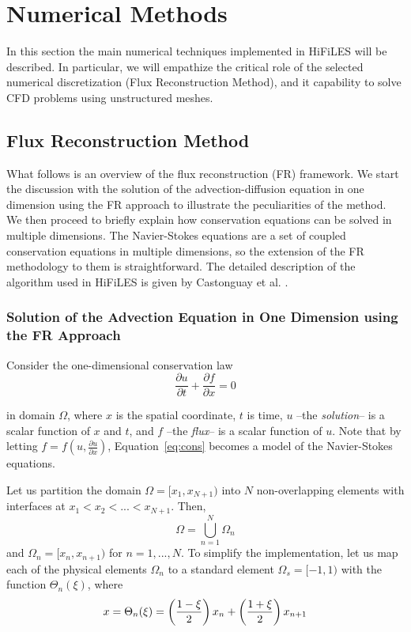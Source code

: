 
\section{Numerical Methods}
\label{sec:numerics}

In this section the main numerical techniques implemented in HiFiLES will be described. In particular, we will empathize the critical role of the selected numerical discretization (Flux Reconstruction Method), and it capability to solve CFD problems using unstructured meshes. 

\subsection{Flux Reconstruction Method}

What follows is an overview of the flux reconstruction (FR) framework. We start the discussion with the solution of the advection-diffusion equation in one dimension using the FR approach to illustrate the peculiarities of the method. We then proceed to briefly explain how conservation equations can be solved in multiple dimensions. The Navier-Stokes equations are a set of coupled conservation equations in multiple dimensions, so the extension of the FR methodology to them is straightforward. The detailed description of the algorithm used in HiFiLES is given by Castonguay et al. \cite{castonguay2011}.

\subsubsection{Solution of the Advection Equation in One Dimension using the FR Approach}

Consider the one-dimensional conservation law
\begin{equation}
\label{eq:cons}
\frac{\partial u}{\partial t} + \frac{\partial f}{\partial x} = 0
\end{equation}

in domain $\Omega$, where $x$ is the spatial coordinate, $t$ is time, $u$ --the \emph{solution}-- is a scalar function of $x$ and $t$, and $f$ --the \emph{flux}-- is a scalar function of $u$. Note that by letting $f = f(u,\frac{\partial u}{\partial x})$, Equation~\ref{eq:cons} becomes a model of the Navier-Stokes equations.

Let us partition the domain $\Omega = [x_1,x_{N+1})$ into $N$ non-overlapping elements with 
interfaces at $x_1<x_2<...<x_{N+1}$. Then,
\begin{equation}
\Omega = \bigcup^N_{n=1} \Omega_n
\end{equation}
and $\Omega_n = [x_n,x_{n+1})$ for $n = 1,...,N$. To simplify the implementation, let us map each of the physical elements $\Omega_n$ to a standard element $\Omega_s=[-1,1)$ with the function $\Theta_n(\xi)$, where
\begin{equation}
x = \Theta_n(\xi) = \left( \frac{1-\xi}{2} \right) x_n + \left(\frac{1+\xi}{2}\right) x_{n+1} 
\end{equation}


